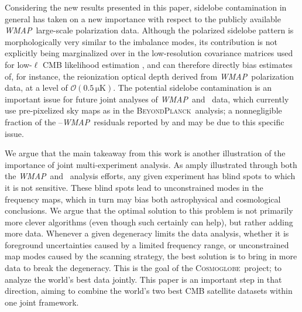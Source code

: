 \documentclass[twocolumn]{aa}
\def\WMAP{\emph{WMAP}}
\newcommand{\BP}{\textsc{BeyondPlanck}}
\newcommand{\cosmoglobe}{\textsc{Cosmoglobe}}
\begin{document}
Considering the new results presented in this paper, sidelobe contamination in
general has taken on a new importance with respect to the publicly available
\WMAP\ large-scale polarization data.  Although the polarized sidelobe pattern is
morphologically very similar to the imbalance modes, its contribution is
not explicitly being marginalized over in the low-resolution covariance
matrices used for low-$\ell$ CMB likelihood estimation \citep{hinshaw2012}, and
can therefore directly bias estimates of, for instance, the reionization
optical depth derived from \WMAP\ polarization data, at a level of $\mathcal
O(0.5\,\mathrm{\mu K})$.  The potential sidelobe contamination is an important
issue for future joint analyses of \WMAP\ and \Planck\ data, which currently
use pre-pixelized sky maps as in the \BP\ analysis; a nonnegligible fraction of
the \Planck--\WMAP\ residuals reported by \citet{planck2016-l04} and
\citet{bp01} may be due to this specific issue.

We argue that the main takeaway from this work is another illustration of the
importance of joint multi-experiment analysis. As amply illustrated through
both the \WMAP\ and \Planck\ analysis efforts, any given experiment has blind
spots to which it is not sensitive. These blind spots lead to unconstrained
modes in the frequency maps, which in turn may bias both astrophysical and
cosmological conclusions. We argue that the optimal solution to this problem is
not primarily more clever algorithms (even though such certainly can help), but
rather adding more data. Whenever a given degeneracy limits the data analysis,
whether it is foreground uncertainties caused by a limited frequency range, or
unconstrained map modes caused by the scanning strategy, the best solution is
to bring in more data to break the degeneracy.  This is the goal of the
\cosmoglobe\ project; to analyze the world's best data jointly. This paper is
an important step in that direction, aiming to combine the world's two best CMB
satellite datasets within one joint framework.







\end{document}
